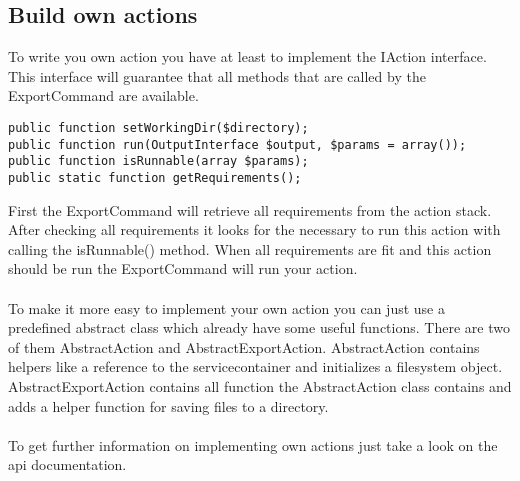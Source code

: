 \subsection{Build own actions}
To write you own action you have at least to implement the IAction interface. This interface will guarantee that all methods that are called by the ExportCommand are available.

\begin{verbatim}
public function setWorkingDir($directory);
public function run(OutputInterface $output, $params = array());
public function isRunnable(array $params);
public static function getRequirements();
\end{verbatim}

\noindent
First the ExportCommand will retrieve all requirements from the action stack. After checking all requirements it looks for the necessary to run this action with calling the isRunnable() method. When all requirements are fit and this action should be run the ExportCommand will run your action.\\
\\
To make it more easy to implement your own action you can just use a predefined abstract class which already have some useful functions. There are two of them AbstractAction and AbstractExportAction. AbstractAction contains helpers like a reference to the servicecontainer and initializes a filesystem object. AbstractExportAction contains all function the AbstractAction class contains and adds a helper function for saving files to a directory. \\
\\
To get further information on implementing own actions just take a look on the api documentation.\\